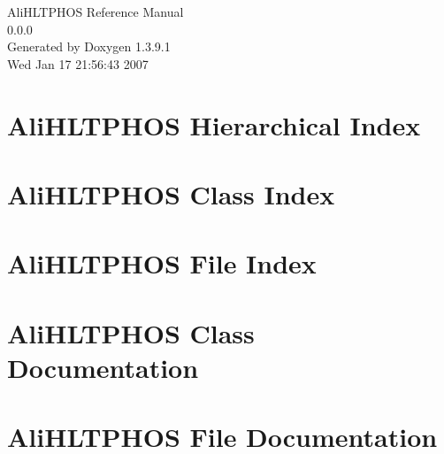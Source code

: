 \documentclass[a4paper]{book}
\begin{document}
\begin{titlepage}
\vspace*{7cm}
\begin{center}
{\Large Ali\-HLTPHOS Reference Manual\\[1ex]\large 0.0.0 }\\
\vspace*{1cm}
{\large Generated by Doxygen 1.3.9.1}\\
\vspace*{0.5cm}
{\small Wed Jan 17 21:56:43 2007}\\
\end{center}
\end{titlepage}
\clearemptydoublepage
{}
\tableofcontents
\clearemptydoublepage
{}
\chapter{Ali\-HLTPHOS Hierarchical Index}

\chapter{Ali\-HLTPHOS Class Index}

\chapter{Ali\-HLTPHOS File Index}

\chapter{Ali\-HLTPHOS Class Documentation}











\chapter{Ali\-HLTPHOS File Documentation}

























\printindex
\end{document}
